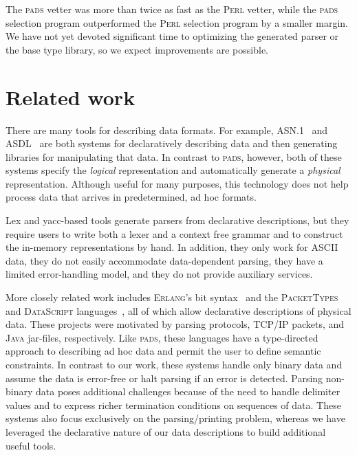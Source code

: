 \documentclass{sigplanconf}
\newcommand{\pads}{\textsc{pads}}
\newcommand{\perl}{\textsc{Perl}}
\newcommand{\java}{\textsc{Java}}
\newcommand{\datascript}{\textsc{DataScript}}
\newcommand{\packettypes}{\textsc{PacketTypes}}
\newcommand{\erlang}{\textsc{Erlang}}
\begin{document}
The \pads{} vetter was more than twice as fast as the \perl{} vetter, while the \pads{} selection program outperformed the \perl{} selection program by a smaller margin.
We have not yet devoted significant time to optimizing the generated parser
or the base type library,
so we expect improvements are possible.

\section{Related work}
There are many tools for describing data formats. For example,
\textsc{ASN.1}~\cite{asn} and \textsc{ASDL}~\cite{asdl} are both
systems for declaratively describing data and then generating
libraries for manipulating that data.  In contrast to \pads{},
however, both of these systems specify the {\em logical\/} representation
and automatically generate a {\em physical\/} representation.
Although useful for many purposes, this technology does not help
process data that arrives in predetermined, ad hoc formats.

Lex and yacc-based tools generate parsers from declarative descriptions, but 
they require users to write both a lexer and a context free grammar and to construct the in-memory representations by hand.  In addition, they only work for ASCII data,  they do not easily accommodate data-dependent parsing, they have a limited error-handling model, and they do not provide auxiliary services. 

More closely related work includes \erlang{}'s bit syntax~\cite{erlang} and
the \packettypes{}~\cite{sigcomm00} and
\datascript{} languages~\cite{gpce02}, 
all of which allow declarative descriptions of physical data.  These projects were motivated by parsing protocols,
\textsc{TCP/IP} packets, and \java{} jar-files, respectively.  Like
\pads{}, these languages have a type-directed approach to
describing ad hoc data and permit the user to define semantic constraints.
In contrast to our
work, these systems handle only binary data and assume the data is
error-free or halt parsing if an error is detected. 
Parsing non-binary data poses additional challenges because of the need
to handle delimiter values and to express richer termination conditions
on sequences of data. These systems also
focus exclusively on the parsing/printing problem, whereas we have 
leveraged the declarative nature of
our data descriptions to build additional useful tools.
\end{document}
